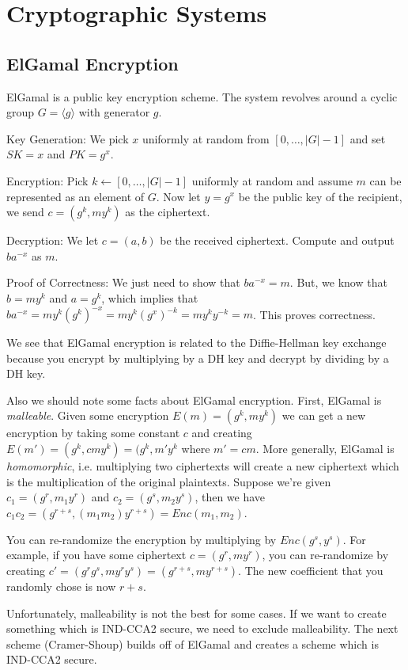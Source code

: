 \documentclass[psamsfonts]{amsart}
\begin{document}
\section{Cryptographic Systems}

\subsection{ElGamal Encryption}

ElGamal is a public key encryption scheme. The system revolves around a cyclic group $G = \langle g \rangle$ with generator $g$.

Key Generation: We pick $x$ uniformly at random from $[0, \ldots, |G|-1]$ and set $SK = x$ and $PK = g^x$.

Encryption: Pick $k \leftarrow [0, \ldots, |G|-1]$ uniformly at random and assume $m$ can be represented as an element of $G$. Now let $y = g^x$ be the public key of the recipient, we send $c = (g^k, m y^k)$ as the ciphertext.

Decryption: We let $c = (a,b)$ be the received ciphertext. Compute and output $b a^{-x}$ as $m$.

Proof of Correctness: We just need to show that $b a^{-x} = m$. But, we know that $b = m y^k$ and $a = g^k$, which implies that $b a^{-x} = m y^k (g^k)^{-x} = m y^k (g^x)^{-k} = m y^k y^{-k} = m$. This proves correctness.

We see that ElGamal encryption is related to the Diffie-Hellman key exchange because you encrypt by multiplying by a DH key and decrypt by dividing by a DH key.

Also we should note some facts about ElGamal encryption. First, ElGamal is \emph{malleable}. Given some encryption $E(m) = (g^k, m y^k)$ we can get a new encryption by taking some constant $c$ and creating $E(m') = (g^k, c m y^k) = (g^k, m' y^k$ where $m' = c m$. More generally, ElGamal is \emph{homomorphic}, i.e. multiplying two ciphertexts will create a new ciphertext which is the multiplication of the original plaintexts. Suppose we're given $c_1 = (g^r, m_1 y^r)$ and $c_2 = (g^s, m_2 y^s)$, then we have $c_1 c_2 = (g^{r+s}, (m_1 m_2) y^{r+s}) = Enc(m_1, m_2)$.

You can re-randomize the encryption by multiplying by $Enc(g^s, y^s)$. For example, if you have some ciphertext $c = (g^r, m y^r)$, you can re-randomize by creating $c' = (g^r g^s, m y^r y^s) = (g^{r+s}, m y^{r+s})$. The new coefficient that you randomly chose is now $r+s$.

Unfortunately, malleability is not the best for some cases. If we want to create something which is IND-CCA2 secure, we need to exclude malleability. The next scheme (Cramer-Shoup) builds off of ElGamal and creates a scheme which is IND-CCA2 secure.
\end{document}
